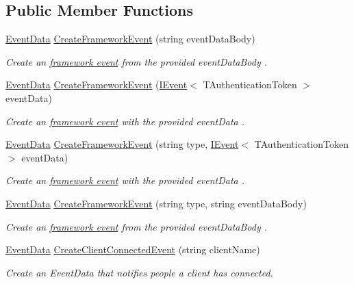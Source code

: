 \subsection*{Public Member Functions}
\begin{DoxyCompactItemize}
\item 
\hyperlink{classCqrs_1_1Events_1_1EventData}{Event\+Data} \hyperlink{interfaceCqrs_1_1EventStore_1_1IEventBuilder_a341d5c54ef8a271a8248e0a5266e6228_a341d5c54ef8a271a8248e0a5266e6228}{Create\+Framework\+Event} (string event\+Data\+Body)
\begin{DoxyCompactList}\small\item\em Create an \hyperlink{}{framework event} from the provided {\itshape event\+Data\+Body} . \end{DoxyCompactList}\item 
\hyperlink{classCqrs_1_1Events_1_1EventData}{Event\+Data} \hyperlink{interfaceCqrs_1_1EventStore_1_1IEventBuilder_a8ee9560f7b53c67b9946c3b0719eca96_a8ee9560f7b53c67b9946c3b0719eca96}{Create\+Framework\+Event} (\hyperlink{interfaceCqrs_1_1Events_1_1IEvent}{I\+Event}$<$ T\+Authentication\+Token $>$ event\+Data)
\begin{DoxyCompactList}\small\item\em Create an \hyperlink{}{framework event} with the provided {\itshape event\+Data} . \end{DoxyCompactList}\item 
\hyperlink{classCqrs_1_1Events_1_1EventData}{Event\+Data} \hyperlink{interfaceCqrs_1_1EventStore_1_1IEventBuilder_ab9608f44e12ce029fc98ad0eee53516a_ab9608f44e12ce029fc98ad0eee53516a}{Create\+Framework\+Event} (string type, \hyperlink{interfaceCqrs_1_1Events_1_1IEvent}{I\+Event}$<$ T\+Authentication\+Token $>$ event\+Data)
\begin{DoxyCompactList}\small\item\em Create an \hyperlink{}{framework event} with the provided {\itshape event\+Data} . \end{DoxyCompactList}\item 
\hyperlink{classCqrs_1_1Events_1_1EventData}{Event\+Data} \hyperlink{interfaceCqrs_1_1EventStore_1_1IEventBuilder_a8e3df7af1f54ac873d1a768b78b82c6d_a8e3df7af1f54ac873d1a768b78b82c6d}{Create\+Framework\+Event} (string type, string event\+Data\+Body)
\begin{DoxyCompactList}\small\item\em Create an \hyperlink{}{framework event} from the provided {\itshape event\+Data\+Body} . \end{DoxyCompactList}\item 
\hyperlink{classCqrs_1_1Events_1_1EventData}{Event\+Data} \hyperlink{interfaceCqrs_1_1EventStore_1_1IEventBuilder_ae11ead7fa69632041e081e60f51c4e9f_ae11ead7fa69632041e081e60f51c4e9f}{Create\+Client\+Connected\+Event} (string client\+Name)
\begin{DoxyCompactList}\small\item\em Create an Event\+Data that notifies people a client has connected. \end{DoxyCompactList}\end{DoxyCompactItemize}


